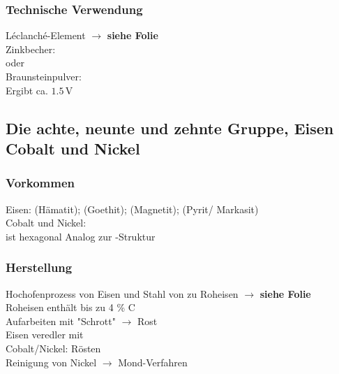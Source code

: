 \documentclass[a4paper, fleqn]{article}
\begin{document}
\subsubsection{Technische Verwendung}
Léclanché-Element $\rightarrow$ \textbf{siehe Folie}\\
Zinkbecher: \\
oder \\
Braunsteinpulver: \\
Ergibt ca. $1.5\,\mathrm{V}$

\subsection{Die achte, neunte und zehnte Gruppe, Eisen Cobalt und Nickel}
\subsubsection{Vorkommen}
Eisen:  (Hämatit);  (Goethit);  (Magnetit);  (Pyrit/ Markasit)\\
Cobalt und Nickel: \\
 ist hexagonal Analog zur -Struktur\\

\subsubsection{Herstellung}
Hochofenprozess von Eisen und Stahl von  zu Roheisen $\rightarrow$ \textbf{siehe Folie}\\
Roheisen enthält bis zu 4 \% C\\
Aufarbeiten mit "Schrott" $\rightarrow$ Rost \\
Eisen veredler mit \\
Cobalt/Nickel: Rösten\\
Reinigung von Nickel $\rightarrow$ Mond-Verfahren\\
\end{document}
